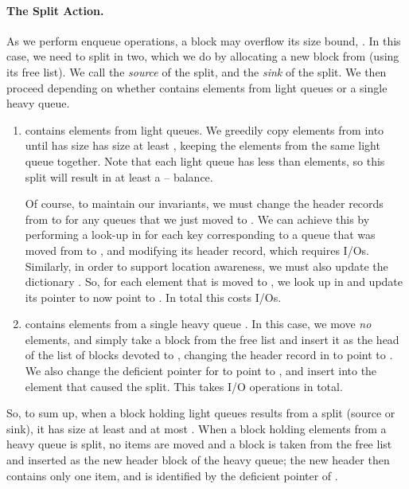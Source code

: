 \documentclass[11pt,letterpaper]{article}
\newcommand{\eat}[1]{}
\begin{document}
\paragraph{The Split Action.}
As we perform enqueue operations, a block  may overflow 
its size bound, .
In this case, we need to split  in two, which we do 
by allocating a new block  from  (using its free list). 
We call  the \emph{source} of the split, and  the \emph{sink} of the split.
We then proceed depending on whether  contains 
elements from light queues or a single heavy queue.
\begin{enumerate}
\item
 contains elements from light queues.
We greedily copy elements from  into  until  has size 
has size at least , keeping the elements from the same light queue together.
Note that each light queue has less than  elements, so this split will result in at
least a -- balance. 

Of course, to maintain our invariants, we must change the header records 
from  to  for any queues that we just moved to .
We can achieve this by performing a look-up in  for each key corresponding to a queue that was moved
from  to , and modifying its header record, which requires  I/Os. Similarly, in order to support location awareness,
we must also update the dictionary . So, for each element 
that is moved to , we look up  in  and update its pointer to now
point to .
In total this costs  I/Os. \eat{ but we can charge these,
in an amortized sense, to the 
enqueue operations that caused 
 to grow from size at most  to at least .
(These enqueue operations will never be charged in this way again.)}
\item
 contains elements from a single heavy queue . In this case, we move \emph{no} elements,
and simply take a block  from the free list and insert it as the head of the list of blocks devoted to , changing
the header record  in  to point to . 
We also change the deficient pointer  for  to point to , and insert into  the element that caused the split.
This takes  I/O operations in total.

\end{enumerate}

So, to sum up, when a block holding light queues 
results from a split (source or sink), it has size
at least  and at most . When a block holding elements
from a heavy queue  is split, no items are moved and a block is taken
from the free list and inserted as the new header block of the heavy queue; the new header then contains only one item,
and is identified by the deficient pointer of . 
\end{document}
